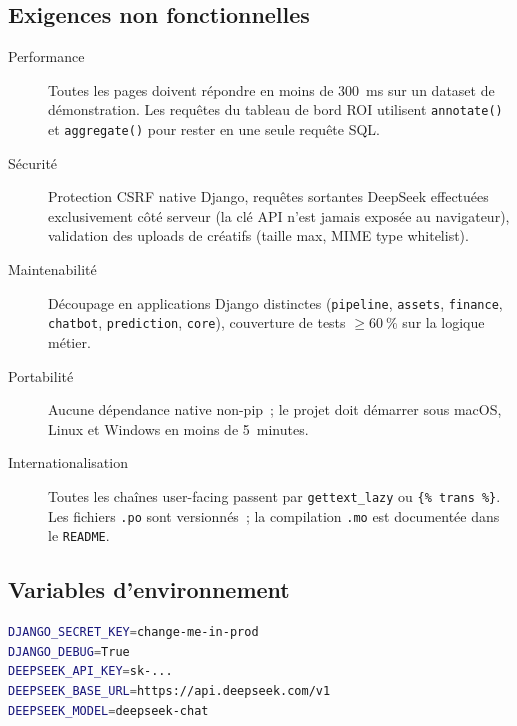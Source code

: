 \subsection{Exigences non fonctionnelles}

\begin{description}
    \item[Performance] Toutes les pages doivent répondre en moins de
    300~ms sur un dataset de démonstration. Les requêtes du tableau de
    bord ROI utilisent \texttt{annotate()} et \texttt{aggregate()} pour
    rester en une seule requête SQL.
    \item[Sécurité] Protection CSRF native Django, requêtes sortantes
    DeepSeek effectuées exclusivement côté serveur (la clé API n'est
    jamais exposée au navigateur), validation des uploads de créatifs
    (taille max, MIME type whitelist).
    \item[Maintenabilité] Découpage en applications Django distinctes
    (\texttt{pipeline}, \texttt{assets}, \texttt{finance}, \texttt{chatbot},
    \texttt{prediction}, \texttt{core}), couverture de tests $\geq 60~\%$
    sur la logique métier.
    \item[Portabilité] Aucune dépendance native non-pip~; le projet doit
    démarrer sous macOS, Linux et Windows en moins de 5~minutes.
    \item[Internationalisation] Toutes les chaînes user-facing passent par
    \texttt{gettext\_lazy} ou \texttt{\{\% trans \%\}}. Les fichiers
    \texttt{.po} sont versionnés~; la compilation \texttt{.mo} est
    documentée dans le \texttt{README}.
\end{description}

\subsection{Variables d'environnement}

\begin{lstlisting}[language=bash,caption={Fichier .env.example},label=lst:env]
DJANGO_SECRET_KEY=change-me-in-prod
DJANGO_DEBUG=True
DEEPSEEK_API_KEY=sk-...
DEEPSEEK_BASE_URL=https://api.deepseek.com/v1
DEEPSEEK_MODEL=deepseek-chat
\end{lstlisting}
